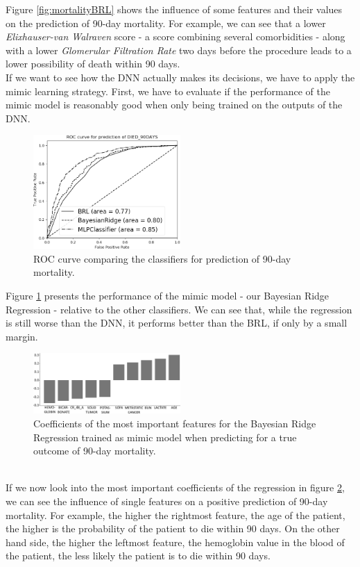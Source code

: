 \documentclass[conference,comsoc]{IEEEtran}
\begin{document}
Figure \ref{fig:mortalityBRL} shows the influence of some features and their values on the prediction of 90-day mortality.
For example, we can see that a lower \emph{Elixhauser-van Walraven} score - a score combining several comorbidities - along with a lower \emph{Glomerular Filtration Rate} two days before the procedure leads to a lower possibility of death within 90 days. \\
If we want to see how the DNN actually makes its decisions, we have to apply the mimic learning strategy.
First, we have to evaluate if the performance of the mimic model is reasonably good when only being trained on the outputs of the DNN.
\newpage
\begin{figure}[h]
	\centering
	\includegraphics[width=0.5\textwidth]{ROC_DIED_90DAYS.png}
	\vspace*{-6mm}
	\caption{ROC curve comparing the classifiers for prediction of 90-day mortality.}
	\label{fig:mortalityROC}	
\end{figure}
Figure \ref{fig:mortalityROC} presents the performance of the mimic model - our Bayesian Ridge Regression - relative to the other classifiers.
We can see that, while the regression is still worse than the DNN, it performs better than the BRL, if only by a small margin.
\begin{figure}[h]
	\centering
	\includegraphics[width=0.5\textwidth]{coef_DIED_90DAYS_adjusted_scale.png}
	\vspace*{-6mm}
	\caption{Coefficients of the most important features for the Bayesian Ridge Regression trained as mimic model when predicting for a true outcome of 90-day mortality.}
	\label{fig:mortalityCOEF}
\end{figure} \\
If we now look into the most important coefficients of the regression in figure \ref{fig:mortalityCOEF}, we can see the influence of single features on a positive prediction of 90-day mortality.
For example, the higher the rightmost feature, the age of the patient, the higher is the probability of the patient to die within 90 days.
On the other hand side, the higher the leftmost feature, the hemoglobin value in the blood of the patient, the less likely the patient is to die within 90 days.
\end{document}
